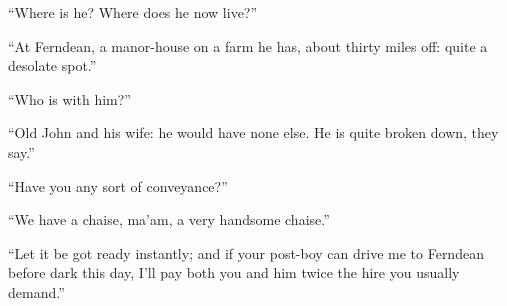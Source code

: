 \enquote{Where is he? Where does he now live?}

\enquote{At Ferndean, a manor-house on a farm he has, about thirty miles
off: quite a desolate spot.}

\enquote{Who is with him?}

\enquote{Old John and his wife: he would have none else. He is quite
broken down, they say.}

\enquote{Have you any sort of conveyance?}

\enquote{We have a chaise, ma'am, a very handsome chaise.}

\enquote{Let it be got ready instantly; and if your post-boy can drive
me to Ferndean before dark this day, I'll pay both you and him twice the
hire you usually demand.}
